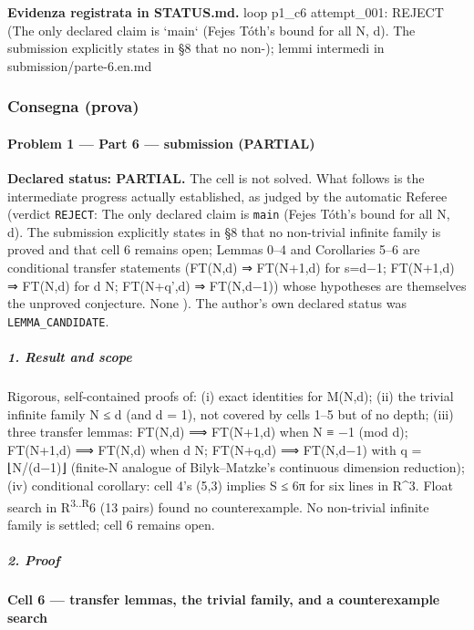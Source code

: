 \documentclass[11pt,a4paper]{article}
\begin{document}
\textbf{Evidenza registrata in STATUS.md.} loop p1\_c6 attempt\_001: REJECT (The only declared claim is `main` (Fejes Tóth's bound for all N, d). The submission explicitly states in §8 that no non-); lemmi intermedi in submission/parte-6.en.md

\subsubsection{Consegna (prova)}
\paragraph{Problem 1 --- Part 6 --- submission
(PARTIAL)}\label{problem-1-part-6-submission-partial}

\textbf{Declared status: PARTIAL.} The cell is not solved. What follows
is the intermediate progress actually established, as judged by the
automatic Referee (verdict \texttt{REJECT}: The only declared claim is
\texttt{main} (Fejes Tóth's bound for all N, d). The submission
explicitly states in §8 that no non-trivial infinite family is proved
and that cell 6 remains open; Lemmas 0--4 and Corollaries 5--6 are
conditional transfer statements (FT(N,d) ⇒ FT(N+1,d) for s=d−1;
FT(N+1,d) ⇒ FT(N,d) for d \textbar{} N; FT(N+q',d) ⇒ FT(N,d−1)) whose
hypotheses are themselves the unproved conjecture. None ). The author's
own declared status was \texttt{LEMMA\_CANDIDATE}.

\subparagraph{1. Result and scope}\label{result-and-scope}

Rigorous, self-contained proofs of: (i) exact identities for M(N,d);
(ii) the trivial infinite family N ≤ d (and d = 1), not covered by cells
1--5 but of no depth; (iii) three transfer lemmas: FT(N,d) ⟹ FT(N+1,d)
when N ≡ −1 (mod d); FT(N+1,d) ⟹ FT(N,d) when d \textbar{} N; FT(N+q,d)
⟹ FT(N,d−1) with q = ⌊N/(d−1)⌋ (finite-N analogue of Bilyk--Matzke's
continuous dimension reduction); (iv) conditional corollary: cell 4's
(5,3) implies S ≤ 6π for six lines in R\^{}3. Float search in
R\textsuperscript{3..R}6 (13 pairs) found no counterexample. No
non-trivial infinite family is settled; cell 6 remains open.

\subparagraph{2. Proof}\label{proof}

\paragraph{Cell 6 --- transfer lemmas, the trivial family, and a
counterexample
search}\label{cell-6-transfer-lemmas-the-trivial-family-and-a-counterexample-search}
\end{document}
